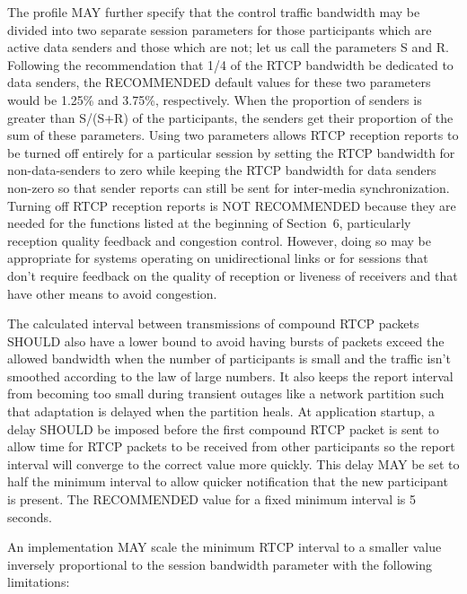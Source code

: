 \documentclass{article}
\begin{document}
The profile MAY further specify that the control traffic bandwidth may be divided into two separate session parameters for those participants which are active data senders and those which are not; let us call the parameters S and R.  Following the recommendation that 1/4 of the RTCP bandwidth be dedicated to data senders, the RECOMMENDED default values for these two parameters would be 1.25\% and 3.75\%, respectively.  When the proportion of senders is greater than S/(S+R) of the participants, the senders get their proportion of the sum of these parameters.  Using two parameters allows RTCP reception reports to be turned off entirely for a particular session by setting the RTCP bandwidth for non-data-senders to zero while keeping the RTCP bandwidth for data senders non-zero so that sender reports can still be sent for inter-media synchronization.  Turning off RTCP reception reports is NOT RECOMMENDED because they are needed for the functions listed at the beginning of Section~6, particularly reception quality feedback and congestion control.  However, doing so may be appropriate for systems operating on unidirectional links or for sessions that don't require feedback on the quality of reception or liveness of receivers and that have other means to avoid congestion.

The calculated interval between transmissions of compound RTCP packets SHOULD also have a lower bound to avoid having bursts of packets exceed the allowed bandwidth when the number of participants is small and the traffic isn't smoothed according to the law of large numbers.  It also keeps the report interval from becoming too small during transient outages like a network partition such that adaptation is delayed when the partition heals.  At application startup, a delay SHOULD be imposed before the first compound RTCP packet is sent to allow time for RTCP packets to be received from other participants so the report interval will converge to the correct value more quickly.  This delay MAY be set to half the minimum interval to allow quicker notification that the new participant is present.  The RECOMMENDED value for a fixed minimum interval is 5 seconds.

An implementation MAY scale the minimum RTCP interval to a smaller value inversely proportional to the session bandwidth parameter with the following limitations:
\end{document}
